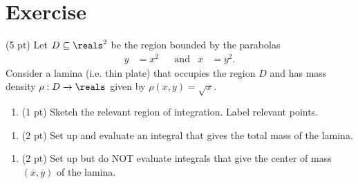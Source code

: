 %
%
\section{Exercise}

(5 pt) Let $D \subseteq \reals^{2}$ be the region bounded by the parabolas
\begin{align*}
y
&=
x^{2}
&
&\text{and}
&
x
&=
y^{2}.
\end{align*}
Consider a lamina (i.e. thin plate) that occupies the region $D$ and has mass density $\rho: D \rightarrow \reals$ given by $\rho(x,y) = \sqrt{x}$.
\begin{enumerate}[label=(\alph*)]
\item (1 pt) Sketch the relevant region of integration. Label relevant points.
\end{enumerate}

\spaceSolution{1in}{}



\begin{enumerate}[resume,label=(\alph*)]
\item (2 pt) Set up and evaluate an integral that gives the total mass of the lamina.
\end{enumerate}

\spaceSolution{3in}{}



\begin{enumerate}[resume,label=(\alph*)]
\item (2 pt) Set up but do NOT evaluate integrals that give the center of mass $(\overline{x},\overline{y})$ of the lamina.
\end{enumerate}

\spaceSolution{1in}{}